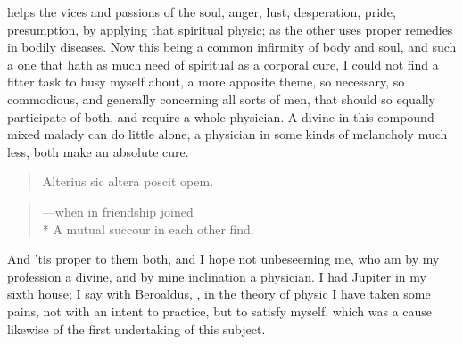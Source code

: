 {helps the vices and passions of the soul, anger, lust, desperation,
pride, presumption, \etc by applying that spiritual physic; as the other
uses proper remedies in bodily diseases. Now this being a common
infirmity of body and soul, and such a one that hath as much need of
spiritual as a corporal cure, I could not find a fitter task to busy
myself about, a more apposite theme, so necessary, so commodious, and
generally concerning all sorts of men, that should so equally
participate of both, and require a whole physician. A divine in this
compound mixed malady can do little alone, a physician in some kinds of
melancholy much less, both make an absolute cure.
%
\begin{latin}
\begin{verse}
Alterius sic altera poscit opem.
\end{verse}
\end{latin}
\translationrule
\begin{verse}
---when in friendship joined\\*
A mutual succour in each other find.
\end{verse}
%

And 'tis proper to them both, and I hope not unbeseeming me, who am by
my profession a divine, and by mine inclination a physician. I had
Jupiter in my sixth house; I say with Beroaldus, , in the theory of physic I have taken some
pains, not with an intent to practice, but to satisfy myself, which was
a cause likewise of the first undertaking of this subject.

}
